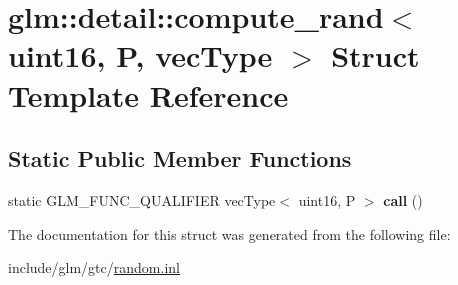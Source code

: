 \hypertarget{structglm_1_1detail_1_1compute__rand_3_01uint16_00_01P_00_01vecType_01_4}{}\section{glm\+:\+:detail\+:\+:compute\+\_\+rand$<$ uint16, P, vec\+Type $>$ Struct Template Reference}
\label{structglm_1_1detail_1_1compute__rand_3_01uint16_00_01P_00_01vecType_01_4}
\subsection*{Static Public Member Functions}
\begin{DoxyCompactItemize}
\item 
\mbox{\label{structglm_1_1detail_1_1compute__rand_3_01uint16_00_01P_00_01vecType_01_4_ae07d663b72169f25cbd1235917acbff8}} 
static G\+L\+M\+\_\+\+F\+U\+N\+C\+\_\+\+Q\+U\+A\+L\+I\+F\+I\+ER vec\+Type$<$ uint16, P $>$ {\bfseries call} ()
\end{DoxyCompactItemize}


The documentation for this struct was generated from the following file\+:\begin{DoxyCompactItemize}
\item 
include/glm/gtc/\hyperlink{random_8inl}{random.\+inl}\end{DoxyCompactItemize}
